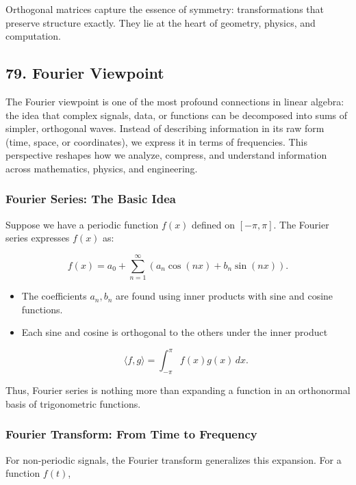 \documentclass[
  letterpaper,
  DIV=11,
  numbers=noendperiod]{scrreprt}
\begin{document}
Orthogonal matrices capture the essence of symmetry: transformations
that preserve structure exactly. They lie at the heart of geometry,
physics, and computation.

\subsection{79. Fourier Viewpoint}\label{fourier-viewpoint}

The Fourier viewpoint is one of the most profound connections in linear
algebra: the idea that complex signals, data, or functions can be
decomposed into sums of simpler, orthogonal waves. Instead of describing
information in its raw form (time, space, or coordinates), we express it
in terms of frequencies. This perspective reshapes how we analyze,
compress, and understand information across mathematics, physics, and
engineering.

\subsubsection{Fourier Series: The Basic
Idea}\label{fourier-series-the-basic-idea}

Suppose we have a periodic function \(f(x)\) defined on \([-\pi, \pi]\).
The Fourier series expresses \(f(x)\) as:

\[
f(x) = a_0 + \sum_{n=1}^\infty \left( a_n \cos(nx) + b_n \sin(nx) \right).
\]

\begin{itemize}
\item
  The coefficients \(a_n, b_n\) are found using inner products with sine
  and cosine functions.
\item
  Each sine and cosine is orthogonal to the others under the inner
  product

  \[
  \langle f, g \rangle = \int_{-\pi}^\pi f(x) g(x) \, dx.
  \]
\end{itemize}

Thus, Fourier series is nothing more than expanding a function in an
orthonormal basis of trigonometric functions.

\subsubsection{Fourier Transform: From Time to
Frequency}\label{fourier-transform-from-time-to-frequency}

For non-periodic signals, the Fourier transform generalizes this
expansion. For a function \(f(t)\),
\end{document}
